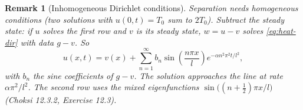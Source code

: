 \documentclass{article}
\newtheorem{remark}{Remark}
\begin{document}
\begin{remark}[Inhomogeneous Dirichlet conditions]
    Separation needs homogeneous conditions (two solutions with $u(0,t) = T_0$ sum to $2T_0$). Subtract the steady state: if $u$ solves the first row and $v$ is its steady state, $w = u - v$ solves \eqref{eq:heat-dir} with data $g - v$. So
    \begin{equation}
        u(x,t) = v(x) + \sum_{n=1}^\infty b_n\sin\left(\frac{n\pi x}{l}\right)e^{-\alpha n^2\pi^2t/l^2},
    \end{equation}
    with $b_n$ the sine coefficients of $g - v$. The solution approaches the line at rate $\alpha\pi^2/l^2$. The second row uses the mixed eigenfunctions $\sin\big((n+\frac12)\pi x/l\big)$ (Choksi 12.3.2, Exercise 12.3).
\end{remark}
\end{document}
